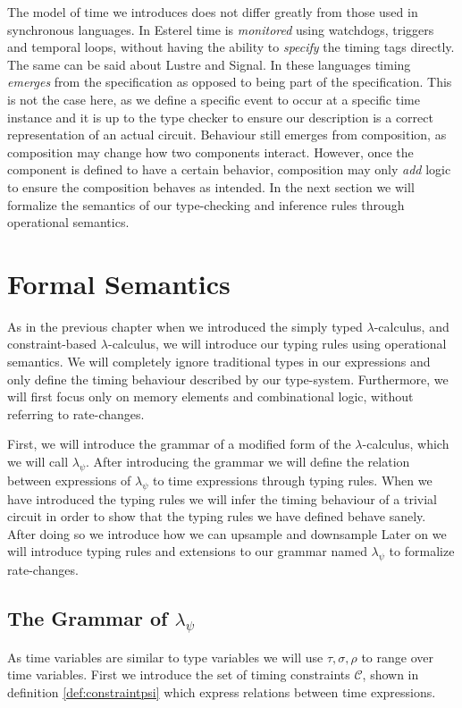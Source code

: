 The model of time we introduces does not differ greatly from those used in synchronous languages.
In Esterel\cite{berry1992esterel} time is \textit{monitored} using watchdogs, triggers and temporal loops, without having the ability to \textit{specify} the timing tags directly.
The same can be said about Lustre and Signal.
In these languages timing \textit{emerges} from the specification as opposed to being part of the specification.
This is not the case here, as we define a specific event to occur at a specific time instance and it is up to the type checker to ensure our description is a correct representation of an actual circuit.
Behaviour still emerges from composition, as composition may change how two components interact.
However, once the component is defined to have a certain behavior, composition may only \textit{add} logic to ensure the composition behaves as intended.
In the next section we will formalize the semantics of our type-checking and inference rules through operational semantics.



\newpage
\section{Formal Semantics}
As in the previous chapter when we introduced the simply typed $\lambda$-calculus, and constraint-based $\lambda$-calculus, we will introduce our typing rules using operational semantics.
We will completely ignore traditional types in our expressions and only define the timing behaviour described by our type-system.
Furthermore, we will first focus only on memory elements and combinational logic, without referring to rate-changes.

First, we will introduce the grammar of a modified form of the $\lambda$-calculus, which we will call $\lambda_\psi$.
After introducing the grammar we will define the relation between expressions of $\lambda_\psi$ to time expressions through typing rules.
When we have introduced the typing rules we will infer the timing behaviour of a trivial circuit in order to show that the typing rules we have defined behave sanely.
After doing so we introduce how we can upsample and downsample 
Later on we will introduce typing rules and extensions to our grammar named $\lambda_\psi$ to formalize rate-changes.


\subsection{The Grammar of $\lambda_\psi$}
As time variables are similar to type variables we will use $\tau,\sigma,\rho$ to range over time variables.
First we introduce the set of timing constraints $\mathcal{C}$, shown in definition \ref{def:constraintpsi} which express relations between time expressions.


